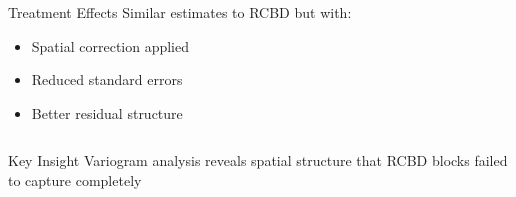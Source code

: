 \begin{frame}
\begin{columns}[T]
\begin{column}{0.5\textwidth}
            \begin{block}{Treatment Effects}
                Similar estimates to RCBD but with:
                \begin{itemize}
                    \item Spatial correction applied
                    \item Reduced standard errors
                    \item Better residual structure
                \end{itemize}
            \end{block}
        \end{column}
    \end{columns}
    
    \vspace{1em}
    
    \begin{exampleblock}{Key Insight}
        Variogram analysis reveals spatial structure that RCBD blocks failed to capture completely
    \end{exampleblock}
\end{frame}

